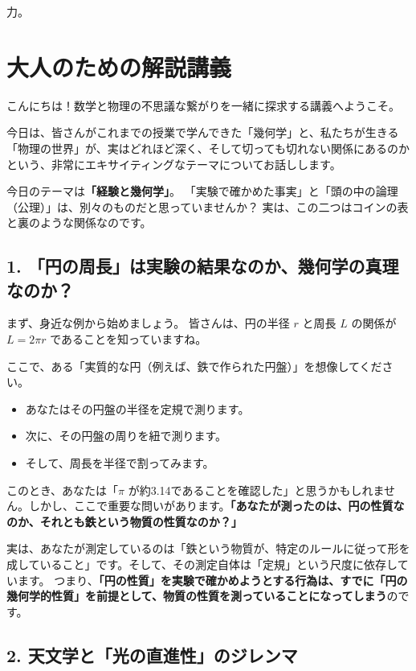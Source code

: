 \documentclass[a4paper,11pt,openany]{ltjsbook}
\begin{document}
力。

\section{大人のための解説講義}
\begin{lecturebox}
こんにちは！数学と物理の不思議な繋がりを一緒に探求する講義へようこそ。

今日は、皆さんがこれまでの授業で学んできた「幾何学」と、私たちが生きる「物理の世界」が、実はどれほど深く、そして切っても切れない関係にあるのかという、非常にエキサイティングなテーマについてお話しします。

今日のテーマは\textbf{「経験と幾何学」}。
「実験で確かめた事実」と「頭の中の論理（公理）」は、別々のものだと思っていませんか？ 実は、この二つはコインの表と裏のような関係なのです。

\subsection*{1. 「円の周長」は実験の結果なのか、幾何学の真理なのか？}

まず、身近な例から始めましょう。
皆さんは、円の半径 $r$ と周長 $L$ の関係が $L = 2\pi r$ であることを知っていますね。

ここで、ある「実質的な円（例えば、鉄で作られた円盤）」を想像してください。
\begin{itemize}[leftmargin=2em]
\item あなたはその円盤の半径を定規で測ります。
\item 次に、その円盤の周りを紐で測ります。
\item そして、周長を半径で割ってみます。
\end{itemize}

このとき、あなたは「$\pi$ が約3.14であることを確認した」と思うかもしれません。しかし、ここで重要な問いがあります。\textbf{「あなたが測ったのは、円の性質なのか、それとも鉄という物質の性質なのか？」}

実は、あなたが測定しているのは「鉄という物質が、特定のルールに従って形を成していること」です。そして、その測定自体は「定規」という尺度に依存しています。
つまり、\textbf{「円の性質」を実験で確かめようとする行為は、すでに「円の幾何学的性質」を前提として、物質の性質を測っていることになってしまう}のです。

\subsection*{2. 天文学と「光の直進性」のジレンマ}


\end{lecturebox}
\end{document}
